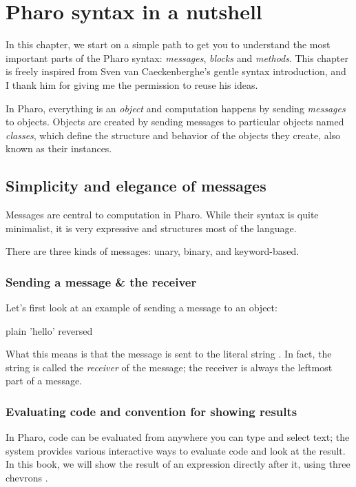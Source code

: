 \documentclass[10pt,twoside,english]{_support/latex/sbabook/sbabook}
\begin{document}
\frontmatter
\pagestyle{plain}

\tableofcontents*
\clearpage\listoffigures

\mainmatter

\chapter{Pharo syntax in a nutshell}\label{cha:syntax}
In this chapter, we start on a simple path to get you to understand the most important parts of the Pharo syntax: \textit{messages}, \textit{blocks} and \textit{methods}.
This chapter is freely inspired from Sven van Caeckenberghe's gentle syntax introduction, and I thank him for giving me the permission to reuse his ideas.

In Pharo, everything is an \textit{object} and computation happens by sending \textit{messages} to objects.
Objects are created by sending messages to particular objects named \textit{classes}, which define the structure and behavior of the objects they create, also known as their instances.
\section{Simplicity and elegance of messages}
Messages are central to computation in Pharo.
While their syntax is quite minimalist, it is very expressive and structures most of the language.

There are three kinds of messages: unary, binary, and keyword-based.
\subsection{Sending a message \& the receiver}
Let’s first look at an example of sending a message to an object:

\begin{displaycode}{plain}
'hello' reversed
\end{displaycode}

What this means is that the message  is sent to the literal string .
In fact, the string  is called the \textit{receiver} of the message; the receiver is always the leftmost part of a message.
\subsection{Evaluating code and convention for showing results}
In Pharo, code can be evaluated from anywhere you can type and select text; the system provides various interactive ways to evaluate code and look at the result.
In this book, we will show the result of an expression directly after it, using three chevrons \textcode{\textgreater{}\textgreater{}\textgreater{}}.
\end{document}
